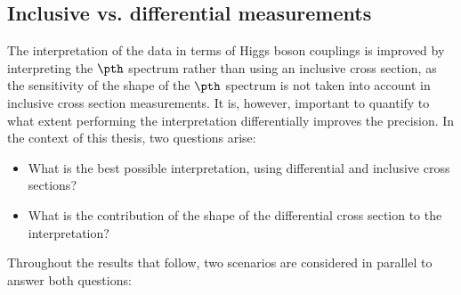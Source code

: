 \subsection{Inclusive vs. differential measurements}
\label{sec:interpretation-brs}

The interpretation of the data in terms of Higgs boson couplings is improved by interpreting the $\pth$ spectrum rather than using an inclusive cross section, as the sensitivity of the shape of the $\pth$ spectrum is not taken into account in inclusive cross section measurements.
% 
It is, however, important to quantify to what extent performing the interpretation differentially improves the precision.
% 
In the context of this thesis, two questions arise:
% 
\begin{itemize}
\item What is the best possible interpretation, using differential and inclusive cross sections?
\item What is the contribution of the shape of the differential cross section to the interpretation?
\end{itemize}
% 
Throughout the results that follow, two scenarios are considered in parallel to answer both questions:
% 
